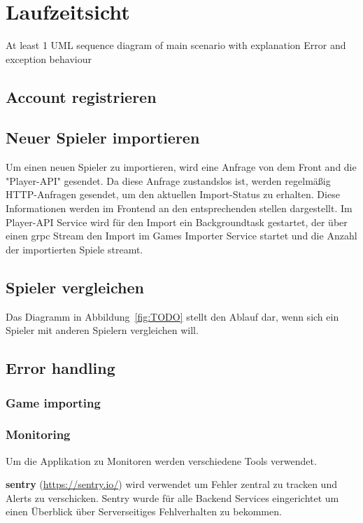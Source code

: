 \section{Laufzeitsicht}
At least 1 UML sequence diagram of main scenario with explanation
Error and exception behaviour
\subsection{Account registrieren}

\subsection{Neuer Spieler importieren}

Um einen neuen Spieler zu importieren, wird eine Anfrage von dem Front and die "Player-API" gesendet.
Da diese Anfrage zustandslos ist, werden regelmäßig HTTP-Anfragen gesendet, um den aktuellen Import-Status
zu erhalten.
Diese Informationen werden im Frontend an den entsprechenden stellen dargestellt.
Im Player-API Service wird für den Import ein Backgroundtask gestartet, der über einen grpc Stream den Import im
Games Importer Service startet und die Anzahl der importierten Spiele streamt.


\subsection{Spieler vergleichen}

Das Diagramm in Abbildung~\ref{fig:TODO} stellt den Ablauf dar, wenn sich ein Spieler mit anderen Spielern vergleichen will.

\subsection{Error handling}
\subsubsection{Game importing}
\subsubsection{Monitoring}

Um die Applikation zu Monitoren werden verschiedene Tools verwendet.

\textbf{sentry} (\href{https://sentry.io/}{https://sentry.io/}) wird verwendet um Fehler zentral zu tracken und
Alerts zu verschicken.
Sentry wurde für alle Backend Services eingerichtet um einen Überblick über Serverseitiges Fehlverhalten zu bekommen.

